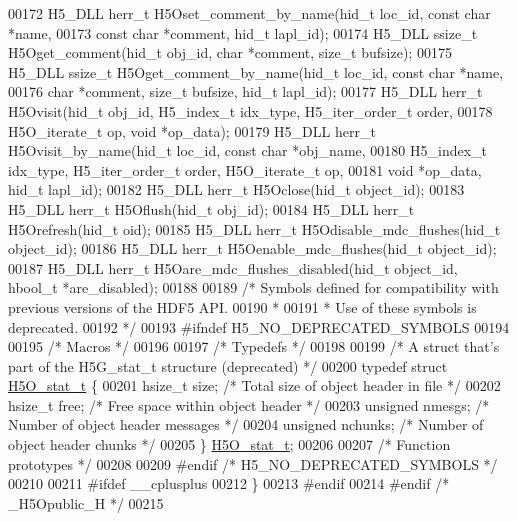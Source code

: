 \begin{DoxyCode}
00172 H5\_DLL herr\_t H5Oset\_comment\_by\_name(hid\_t loc\_id, \textcolor{keyword}{const} \textcolor{keywordtype}{char} *name,
00173     \textcolor{keyword}{const} \textcolor{keywordtype}{char} *comment, hid\_t lapl\_id);
00174 H5\_DLL ssize\_t H5Oget\_comment(hid\_t obj\_id, \textcolor{keywordtype}{char} *comment, \textcolor{keywordtype}{size\_t} bufsize);
00175 H5\_DLL ssize\_t H5Oget\_comment\_by\_name(hid\_t loc\_id, \textcolor{keyword}{const} \textcolor{keywordtype}{char} *name,
00176     \textcolor{keywordtype}{char} *comment, \textcolor{keywordtype}{size\_t} bufsize, hid\_t lapl\_id);
00177 H5\_DLL herr\_t H5Ovisit(hid\_t obj\_id, H5\_index\_t idx\_type, H5\_iter\_order\_t order,
00178     H5O\_iterate\_t op, \textcolor{keywordtype}{void} *op\_data);
00179 H5\_DLL herr\_t H5Ovisit\_by\_name(hid\_t loc\_id, \textcolor{keyword}{const} \textcolor{keywordtype}{char} *obj\_name,
00180     H5\_index\_t idx\_type, H5\_iter\_order\_t order, H5O\_iterate\_t op,
00181     \textcolor{keywordtype}{void} *op\_data, hid\_t lapl\_id);
00182 H5\_DLL herr\_t H5Oclose(hid\_t object\_id);
00183 H5\_DLL herr\_t H5Oflush(hid\_t obj\_id);
00184 H5\_DLL herr\_t H5Orefresh(hid\_t oid);
00185 H5\_DLL herr\_t H5Odisable\_mdc\_flushes(hid\_t object\_id);
00186 H5\_DLL herr\_t H5Oenable\_mdc\_flushes(hid\_t object\_id);
00187 H5\_DLL herr\_t H5Oare\_mdc\_flushes\_disabled(hid\_t object\_id, hbool\_t *are\_disabled);
00188 
00189 \textcolor{comment}{/* Symbols defined for compatibility with previous versions of the HDF5 API.}
00190 \textcolor{comment}{ *}
00191 \textcolor{comment}{ * Use of these symbols is deprecated.}
00192 \textcolor{comment}{ */}
00193 \textcolor{preprocessor}{#ifndef H5\_NO\_DEPRECATED\_SYMBOLS}
00194 
00195 \textcolor{comment}{/* Macros */}
00196 
00197 \textcolor{comment}{/* Typedefs */}
00198 
00199 \textcolor{comment}{/* A struct that's part of the H5G\_stat\_t structure (deprecated) */}
00200 \textcolor{keyword}{typedef} \textcolor{keyword}{struct }\hyperlink{struct_h5_o__stat__t}{H5O\_stat\_t} \{
00201     hsize\_t size;               \textcolor{comment}{/* Total size of object header in file */}
00202     hsize\_t free;               \textcolor{comment}{/* Free space within object header */}
00203     \textcolor{keywordtype}{unsigned} nmesgs;            \textcolor{comment}{/* Number of object header messages */}
00204     \textcolor{keywordtype}{unsigned} nchunks;           \textcolor{comment}{/* Number of object header chunks */}
00205 \} \hyperlink{struct_h5_o__stat__t}{H5O\_stat\_t};
00206 
00207 \textcolor{comment}{/* Function prototypes */}
00208 
00209 \textcolor{preprocessor}{#endif }\textcolor{comment}{/* H5\_NO\_DEPRECATED\_SYMBOLS */}\textcolor{preprocessor}{}
00210 
00211 \textcolor{preprocessor}{#ifdef \_\_cplusplus}
00212 \}
00213 \textcolor{preprocessor}{#endif}
00214 \textcolor{preprocessor}{#endif }\textcolor{comment}{/* \_H5Opublic\_H */}\textcolor{preprocessor}{}
00215 
\end{DoxyCode}
